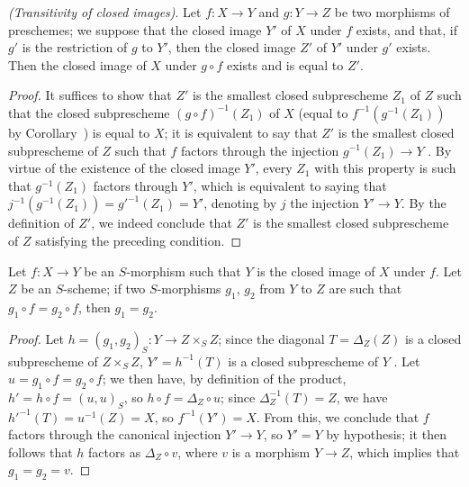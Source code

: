 \begin{proposition}[9.5.5]
\label{I.9.5.5}
\emph{(Transitivity of closed images)}. Let $f:X\to Y$ and $g:Y\to Z$ be two morphisms of
preschemes; we suppose that the closed image $Y'$ of $X$ under $f$ exists, and that, if $g'$
is the restriction of $g$ to $Y'$, then the closed image $Z'$ of $Y'$ under $g'$ exists. Then
the closed image of $X$ under $g\circ f$ exists and is equal to $Z'$.
\end{proposition}

\begin{proof}
It suffices  to show that $Z'$ is the smallest closed
subprescheme $Z_1$ of $Z$ such that the closed subprescheme $(g\circ f)^{-1}(Z_1)$ of $X$
(equal to $f^{-1}(g^{-1}(Z_1))$ by Corollary~) is equal to
$X$; it is equivalent to say that $Z'$ is the smallest closed subprescheme of $Z$ such that
$f$ factors through the injection $g^{-1}(Z_1)\to Y$ . By
virtue of the existence of the closed image $Y'$, every $Z_1$ with this property is such
that $g^{-1}(Z_1)$ factors through $Y'$, which is equivalent to saying that $j^{-1}(g^{-1}(Z_1))=g'^{-1}(Z_1)=Y'$, denoting by $j$ the injection $Y'\to Y$.
By the definition of $Z'$, we indeed conclude that $Z'$ is the smallest closed
subprescheme of $Z$ satisfying the preceding condition.
\end{proof}

\begin{corollary}[9.5.6]
\label{I.9.5.6}
Let $f:X\to Y$ be an $S$-morphism such that $Y$ is the closed image of $X$ under $f$.
Let $Z$ be an $S$-scheme; if two $S$-morphisms $g_1$, $g_2$ from $Y$ to $Z$ are such that $g_1\circ f=g_2\circ f$, then $g_1=g_2$.
\end{corollary}

\begin{proof}
Let $h=(g_1,g_2)_S:Y\to Z\times_S Z$; since the diagonal $T=\Delta_Z(Z)$ is a closed subprescheme of $Z\times_S Z$, $Y'=h^{-1}(T)$ is a closed subprescheme of $Y$ .
Let $u=g_1\circ f=g_2\circ f$; we then have, by definition of the product, $h'=h\circ f=(u,u)_S$, so $h\circ f=\Delta_Z\circ u$; since $\Delta_Z^{-1}(T)=Z$, we have $h'^{-1}(T)=u^{-1}(Z)=X$, so $f^{-1}(Y')=X$.
From this, we conclude  that $f$ factors through the canonical injection $Y'\to Y$, so $Y'=Y$ by hypothesis; it then follows  that $h$ factors as $\Delta_Z\circ v$, where $v$ is a morphism $Y\to Z$, which implies that $g_1=g_2=v$.
\end{proof}

